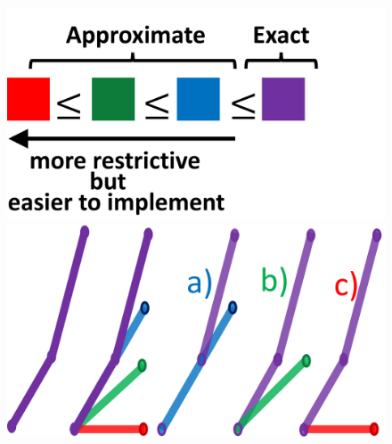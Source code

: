 \documentclass[8pt, oneside]{beamer}   	%
\begin{document}
\begin{frame}
\begin{itemize}
{\begin{figure}[htbp!]
\includegraphics[scale=0.11]{img/coarseconstraintexactapprox.pdf}
		\includegraphics[scale=0.11]{img/coarseconstraintabc.pdf}
\end{figure}
}
\end{itemize}
\end{frame}
\end{document}
